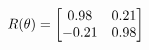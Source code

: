 \documentclass[preview]{standalone}
\begin{document}
\begin{align*}
\special{dvisvgm:raw <g id='unique000'>}R(\theta) = \begin{bmatrix}0.98 & 0.21\\-0.21 & 0.98\end{bmatrix}\special{dvisvgm:raw </g>}
\end{align*}
\end{document}
